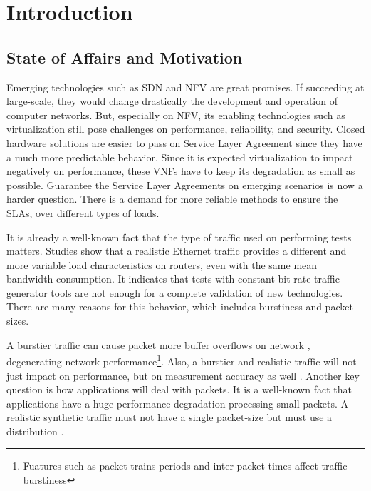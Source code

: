 \chapter{Introduction}\label{ch:introduction}

\section{State of Affairs and Motivation}\label{sec:state-of-the-art}
 

Emerging technologies such as SDN and NFV are great promises. If succeeding at large-scale, they would change drastically the development and operation of computer networks. But, especially on NFV, its enabling technologies such as virtualization still pose challenges on performance,  reliability, and security\cite{nfv-challenges}. Closed hardware solutions are easier to pass on Service Layer Agreement since they have a much more predictable behavior. Since it is expected virtualization to impact negatively on performance, these VNFs have to keep its degradation as small as possible. Guarantee the Service Layer Agreements on emerging scenarios is now a harder question. There is a demand for more reliable methods to ensure the SLAs, over different types of loads.


It is already a well-known fact that the type of traffic used on performing tests matters. Studies show that a realistic Ethernet traffic provides a different and more variable load characteristics on routers\cite{harpoon-validation}, even with the same mean bandwidth consumption. It indicates that tests with constant bit rate traffic generator tools are not enough for a complete validation of new technologies. There are many reasons for this behavior, which includes burstiness and packet sizes.


A burstier traffic can cause packet more buffer overflows on network \cite{burstiness-queue-lenght} \cite{modelling-of-self-similar} \cite{empirical-interarrival-study}, degenerating network performance\footnote{Fuatures such as packet-trains periods and inter-packet times affect traffic burstiness}. Also, a burstier and realistic traffic will not just impact on performance, but on measurement accuracy as well \cite{legotg-paper} \cite{background-traffic-matter}. Another key question is how applications will deal with packets. It is a well-known fact that applications have a huge performance degradation processing small packets\cite{comparative-trafficgen-tools}. A realistic synthetic traffic must not have a single packet-size but must use a distribution \cite{packet-distribution-model}. 


